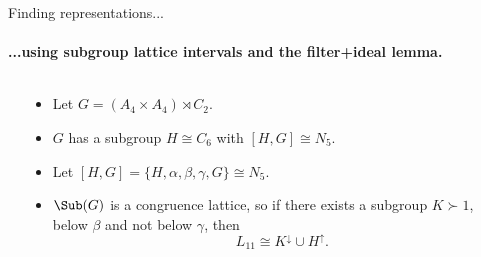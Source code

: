 \documentclass[xcolor=dvipsnames,9pt,hide notes]{beamer}
\begin{document}
\begin{frame}[label=knownresults,shrink=5]{Finding representations...}
  \framesubtitle{...using subgroup lattice intervals and the filter+ideal lemma.}

  \begin{columns}
    \begin{column}{0.2\textwidth}
      \begin{center}
      \end{center}
    \end{column}
    \begin{column}{0.6\textwidth}
      \vskip1cm
      \begin{itemize}
      \item<2-> 
        Let $G=(A_4 \times A_4) \rtimes C_2$. %
      \item<2-> $G$ has a subgroup $H \cong C_6$ with $[H, G] \cong N_5$. \hskip6pt %
      \item<2-> Let $[H, G] = \{H, \alpha, \beta, \gamma, G\} \cong N_5$.\vskip6pt
      \item<3-> $\Sub(G)$ is a congruence lattice, so
        if there exists a subgroup $K \succ 1$, below $\beta$ and not below $\gamma$, 
        then \[L_{11} \cong K^\downarrow \cup H^\uparrow.\]
      \end{itemize}
    \end{column}
  \end{columns}


\end{frame}
\end{document}
